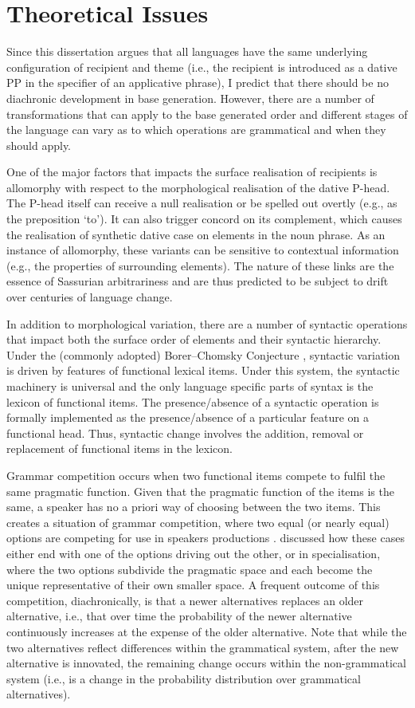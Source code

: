 \section{Theoretical Issues}
	Since this dissertation argues that all languages have the same underlying configuration of recipient and theme (i.e., the recipient is introduced as a dative PP in the specifier of an applicative phrase), I predict that there should be no diachronic development in base generation. However, there are a number of transformations that can apply to the base generated order and different stages of the language can vary as to which operations are grammatical and when they should apply.

	One of the major factors that impacts the surface realisation of recipients is allomorphy with respect to the morphological realisation of the dative P-head. The P-head itself can receive a null realisation or be spelled out overtly (e.g., as the preposition `to'). It can also trigger concord on its complement, which causes the realisation of synthetic dative case on elements in the noun phrase. As an instance of allomorphy, these variants can be sensitive to contextual information (e.g., the properties of surrounding elements). The nature of these links are the essence of Sassurian arbitrariness and are thus predicted to be subject to drift over centuries of language change.

	In addition to morphological variation, there are a number of syntactic operations that impact both the surface order of elements and their syntactic hierarchy. Under the (commonly adopted) Borer--Chomsky Conjecture \citep{Baker.2008}, syntactic variation is driven by features of functional lexical items. Under this system, the syntactic machinery is universal and the only language specific parts of syntax is the lexicon of functional items. The presence/absence of a syntactic operation is formally implemented as the presence/absence of a particular feature on a functional head. Thus, syntactic change involves the addition, removal or replacement of functional items in the lexicon.

	Grammar competition occurs when two functional items compete to fulfil the same pragmatic function. Given that the pragmatic function of the items is the same, a speaker has no a priori way of choosing between the two items. This creates a situation of grammar competition, where two equal (or nearly equal) options are competing for use in speakers productions \citep{Kroch.1989}. \cite{Wallenberg.2013} discussed how these cases either end with one of the options driving out the other, or in specialisation, where the two options subdivide the pragmatic space and each become the unique representative of their own smaller space. A frequent outcome of this competition, diachronically, is that a newer alternatives replaces an older alternative, i.e., that over time the probability of the newer alternative continuously increases at the expense of the older alternative. Note that while the two alternatives reflect differences within the grammatical system, after the new alternative is innovated, the remaining change occurs within the non-grammatical system (i.e., is a change in the probability distribution over grammatical alternatives).

